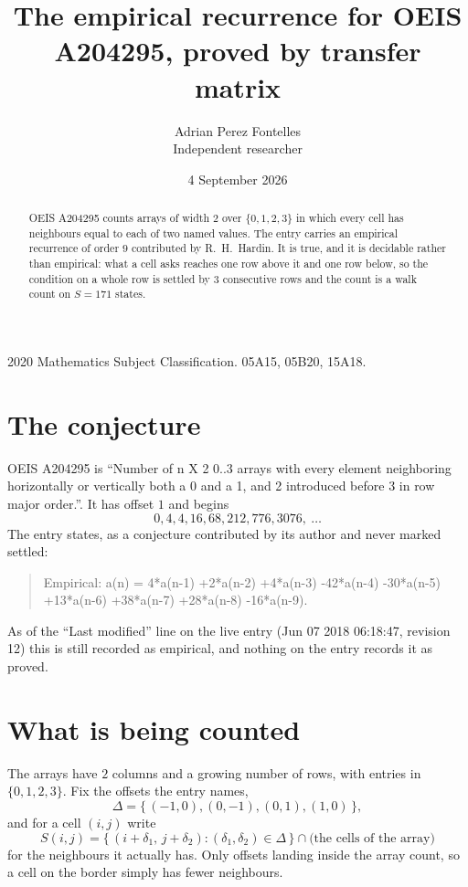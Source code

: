 \documentclass[11pt,a4paper]{article}
\title{The empirical recurrence for OEIS A204295, proved by transfer matrix}
\author{Adrian Perez Fontelles\\ \small Independent researcher}
\date{4 September 2026}
\theoremstyle{plain}
\theoremstyle{definition}
\begin{document}
\maketitle

\begin{abstract}
OEIS A204295 counts arrays of width $2$ over $\{0,1,2,3\}$ in which every cell has neighbours equal to each of two named values. The entry carries an
empirical recurrence of order $9$ contributed by R.~H.~Hardin. It is true, and it is
decidable rather than empirical: what a cell asks reaches one row above it and one row below, so the
condition on a whole row is settled by $3$ consecutive rows and the count is a walk
count on $S=171$ states.
\end{abstract}

\noindent\small 2020 Mathematics Subject Classification. 05A15, 05B20, 15A18.\normalsize

\section{The conjecture}

OEIS A204295 is ``Number of n X 2 0..3 arrays with every element neighboring horizontally or vertically both a 0 and a 1, and 2 introduced before 3 in row major order.''. It has offset $1$ and begins
\[
0, 4, 4, 16, 68, 212, 776, 3076,\ \dots
\]
The entry states, as a conjecture contributed by its author and never marked settled:
\begin{quote}
Empirical: a(n) = 4*a(n-1) +2*a(n-2) +4*a(n-3) -42*a(n-4) -30*a(n-5) +13*a(n-6) +38*a(n-7) +28*a(n-8) -16*a(n-9).
\end{quote}
As of the ``Last modified'' line on the live entry (Jun 07 2018 06:18:47, revision 12) this is still
recorded as empirical, and nothing on the entry records it as proved.

\section{What is being counted}

The arrays have $2$ columns and a growing number of rows, with entries in $\{0,1,2,3\}$. Fix the
offsets the entry names,
\[
\Delta=\{\,(-1,0), (0,-1), (0,1), (1,0)\,\},
\]
and for a cell $(i,j)$ write
\[
S(i,j)=\{\,(i+\delta_1,\,j+\delta_2) : (\delta_1,\delta_2)\in\Delta\,\}\cap
\text{(the cells of the array)}
\]
for the neighbours it actually has. Only offsets landing inside the array count, so a cell on
the border simply has fewer neighbours.
\end{document}
